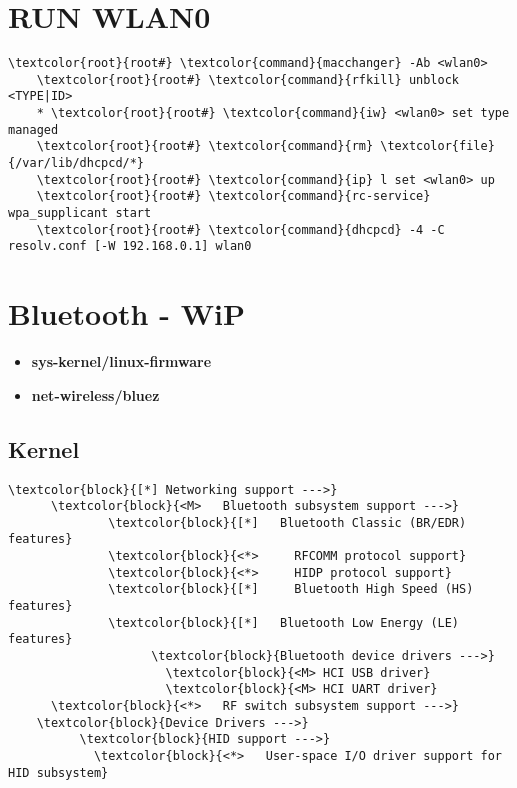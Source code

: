\documentclass[10pt, a4paper, onecolumn, openany]{book}         %
\begin{document}
\section{RUN WLAN0}
\begin{Verbatim}[commandchars=\\\{\}]
    \textcolor{root}{root#} \textcolor{command}{macchanger} -Ab <wlan0>
    \textcolor{root}{root#} \textcolor{command}{rfkill} unblock <TYPE|ID>
    * \textcolor{root}{root#} \textcolor{command}{iw} <wlan0> set type managed
    \textcolor{root}{root#} \textcolor{command}{rm} \textcolor{file}{/var/lib/dhcpcd/*}
    \textcolor{root}{root#} \textcolor{command}{ip} l set <wlan0> up
    \textcolor{root}{root#} \textcolor{command}{rc-service} wpa_supplicant start
    \textcolor{root}{root#} \textcolor{command}{dhcpcd} -4 -C resolv.conf [-W 192.168.0.1] wlan0
\end{Verbatim}



\section{Bluetooth - WiP}
\begin{itemize}
    \item \textbf{sys-kernel/linux-firmware}
    \item \textbf{net-wireless/bluez}
\end{itemize}
\subsection{Kernel}
\begin{Verbatim}[commandchars=\\\{\}]
\textcolor{block}{[*] Networking support --->}
      \textcolor{block}{<M>   Bluetooth subsystem support --->}
              \textcolor{block}{[*]   Bluetooth Classic (BR/EDR) features}
              \textcolor{block}{<*>     RFCOMM protocol support}
              \textcolor{block}{<*>     HIDP protocol support}
              \textcolor{block}{[*]     Bluetooth High Speed (HS) features}
              \textcolor{block}{[*]   Bluetooth Low Energy (LE) features}
                    \textcolor{block}{Bluetooth device drivers --->}
                      \textcolor{block}{<M> HCI USB driver}
                      \textcolor{block}{<M> HCI UART driver}
      \textcolor{block}{<*>   RF switch subsystem support --->}
    \textcolor{block}{Device Drivers --->}
          \textcolor{block}{HID support --->}
            \textcolor{block}{<*>   User-space I/O driver support for HID subsystem}
\end{Verbatim}
\end{document}
